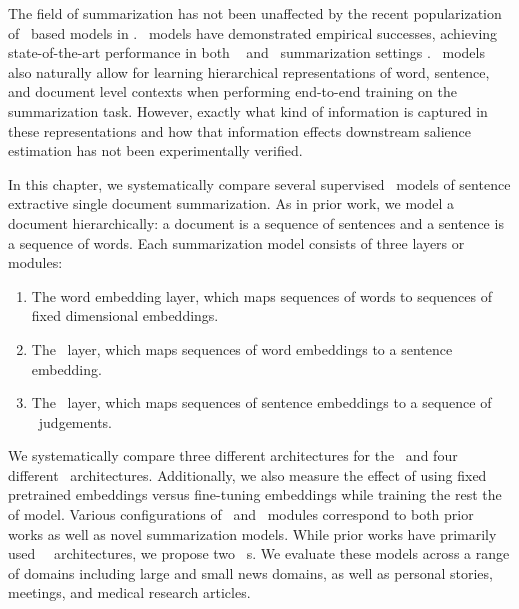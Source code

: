 The field of summarization has not been unaffected by the recent popularization of \deeplearning~based models in \naturallanguageprocessing.
\Deeplearning~models
have demonstrated empirical successes, achieving state-of-the-art 
performance in both \extractive~\citep{somepeople} and \abstractive~summarization 
settings \citep{someothers}. \Deeplearning~models also naturally allow for learning
hierarchical representations of word, sentence, and document
level contexts when performing end-to-end training on the summarization 
task.
However, exactly what kind of information is captured in these representations
and how that information effects downstream salience estimation has not 
been experimentally verified. 


In this chapter, we systematically compare several supervised 
\deeplearning~models of sentence extractive single document summarization.
As in prior work, we model a document hierarchically: a document is 
a sequence of sentences and a sentence is a sequence of words. 
Each summarization model consists of three layers or modules: 
\begin{enumerate}
    \item The word
embedding layer, which maps sequences of words to sequences of fixed 
dimensional embeddings. 
\item The \sentenceencoder~layer, which
maps sequences of word embeddings to a sentence embedding. 
\item The 
\sentenceextractor~layer, which maps sequences of sentence embeddings to
a sequence of \salience~judgements.
\end{enumerate}

We systematically compare three different architectures for the \sentenceencoder~and four different \sentenceextractor~architectures. Additionally, 
we also measure the effect of using fixed pretrained embeddings versus 
fine-tuning embeddings while training the rest the of model. 
Various configurations of \encoder~and \extractor~modules correspond to
both prior works as well as novel summarization models. While prior works 
have primarily used \autoregressive~\sentenceextractor~architectures, we propose two
\nonautoregressive~\sentenceextractor s.
We evaluate these
models across a range of domains including large and small news domains,
as well as personal stories, meetings, and medical research articles. 



